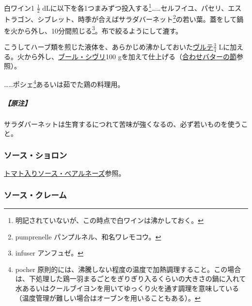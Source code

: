 \begin{recette}


白ワイン1 \(\frac{1}{2}\) dLに以下を各1つまみずつ投入する\footnote{明記されていないが、この時点で白ワインは沸かしておく。}\ldots{}\ldots{}セルフイユ、パセリ、エストラゴン、シブレット、時季が合えばサラダバーネット\footnote{pumprenelle
  パンプルネル、和名ワレモコウ。}の若い葉。蓋をして鍋を火から外し、10分間煎じる\footnote{infuser
  アンフュゼ。}。布で絞るようにして漉す。

こうしてハーブ類を煎じた液体を、あらかじめ沸かしておいた\protect\hyperlink{veloute}{ヴルテ}\(\frac{3}{4}\)
Lに加える。火から外し、\protect\hyperlink{beurre-chivry}{ブール・シヴリ}100
gを加えて仕上げる（\protect\hyperlink{beurres-composes}{合わせバターの節}参照）。

\ldots{}\ldots{}ポシェ\footnote{pocher
  原則的には、沸騰しない程度の温度で加熱調理すること。この場合は、下処理した鶏一羽まるごとをぎりぎり入るくらいの大きさの鍋に入れて水あるいはクールブイヨンを用いてゆっくり火を通す調理を意味している（温度管理が難しい場合はオーブンを用いることもある）。}あるいは茹でた鶏の料理用。

\hypertarget{nota-sauce-chivry}{%
\subparagraph{【原注】}\label{nota-sauce-chivry}}

サラダバーネットは生育するにつれて苦味が強くなるの、必ず若いものを使うこと。

\hypertarget{sauce-choron}{%
\subsubsection{ソース・ショロン}\label{sauce-choron}}


\protect\hyperlink{sauce-bearnaise-tomatee}{トマト入りソース・ベアルネーズ}参照。

\hypertarget{sauce-creme}{%
\subsubsection{ソース・クレーム}\label{sauce-creme}}




\end{recette}

